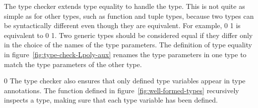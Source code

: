 \documentclass[7x10]{TimesAPriori_MIT}%
\def\racketEd{0}
\def\pythonEd{1}
\def\edition{0}
\newcommand{\racket}[1]{{\if\edition\racketEd{#1}\fi}}
\newcommand{\python}[1]{{\if\edition\pythonEd #1\fi}}
\numberwithin{theorem}{chapter}
\numberwithin{definition}{chapter}
\numberwithin{equation}{chapter}
\begin{document}
The type checker extends type equality to handle the  type.
This is not quite as simple as for other types, such as function and
tuple types, because two  types can be syntactically
different even though they are equivalent. For example,
%
\racket{}
\python{}
is equivalent to
\racket{}
\python{}.
%
Two generic types should be considered equal if they differ only in
the choice of the names of the type parameters. The definition of type
equality in figure~\ref{fig:type-check-Lpoly-aux} renames the type
parameters in one type to match the type parameters of the other type.

\if\edition\racketEd
%
The type checker also ensures that only defined type variables appear
in type annotations. The  function defined
in figure~\ref{fig:well-formed-types} recursively inspects a type,
making sure that each type variable has been defined.
%
\fi
\end{document}
